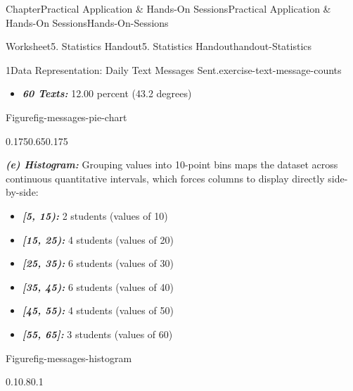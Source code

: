 \documentclass[oneside,10pt,]{book}
\newcommand{\ptxlistdisc}{\raisebox{0.3ex}{\textbullet}}
\newcommand{\alert}[1]{\textbf{\textit{#1}}}
\begin{document}
\begin{chapterptx}{Chapter}{Practical Application \& Hands-On Sessions}{}{Practical Application \& Hands-On Sessions}{}{}{Hands-On-Sessions}
\begin{worksheet-section}{Worksheet}{5. Statistics Handout}{}{5. Statistics Handout}{}{}{handout-Statistics}
\begin{divisionexercise}{1}{Data Representation: Daily Text Messages Sent.}{}{exercise-text-message-counts}
\begin{itemize}[label=\ptxlistdisc]
\item{}\alert{60 Texts:} 12.00 percent (43.2 degrees)%
\end{itemize}
%
\begin{figureptx}{Figure}{}{fig-messages-pie-chart}{}%
\begin{image}{0.175}{0.65}{0.175}{}%
%
\end{image}%
\tcblower
\end{figureptx}%
\alert{(e) Histogram:} Grouping values into 10-point bins maps the dataset across continuous quantitative intervals, which forces columns to display directly side-by-side:%
\par
%
\begin{itemize}[label=\ptxlistdisc]
\item{}\alert{[5, 15):} 2 students (values of 10)%
\item{}\alert{[15, 25):} 4 students (values of 20)%
\item{}\alert{[25, 35):} 6 students (values of 30)%
\item{}\alert{[35, 45):} 6 students (values of 40)%
\item{}\alert{[45, 55):} 4 students (values of 50)%
\item{}\alert{[55, 65]:} 3 students (values of 60)%
\end{itemize}
%
\begin{figureptx}{Figure}{}{fig-messages-histogram}{}%
\begin{image}{0.1}{0.8}{0.1}{}%
\resizebox{\linewidth}{!}{%
\begin{tikzpicture}

\end{tikzpicture}}
\end{image}
\end{figureptx}
\end{divisionexercise}
\end{worksheet-section}
\end{chapterptx}
\end{document}
